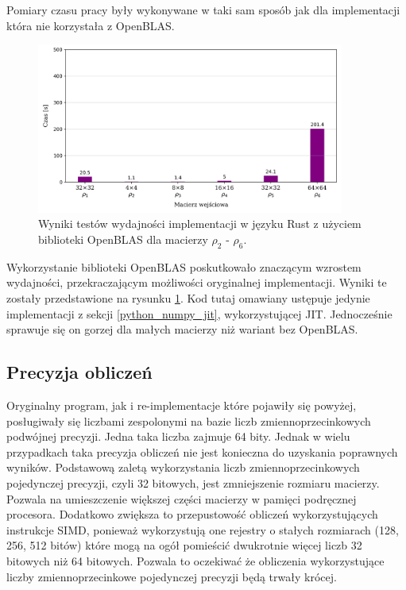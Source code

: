 \documentclass[11pt, a4paper]{article}
\begin{document}
\begin{sloppypar}
    Pomiary czasu pracy były wykonywane w taki sam sposób jak dla implementacji która nie
    korzystała z OpenBLAS.

    \FloatBarrier
    \begin{figure}[ht]
      \centering
      \includegraphics[width=0.9\textwidth]{"resources/rust_blas_perf_tests.png"}
      \caption{Wyniki testów wydajności implementacji w języku Rust z użyciem biblioteki OpenBLAS dla macierzy $\rho
      _{2}$ - $\rho_{6}$.}
      \label{fifth-perf}
    \end{figure}
    \FloatBarrier

    Wykorzystanie biblioteki OpenBLAS poskutkowało znaczącym wzrostem wydajności, przekraczającym
    możliwości oryginalnej implementacji. Wyniki te zostały przedstawione na rysunku
    \ref{fifth-perf}. Kod tutaj omawiany ustępuje jedynie implementacji z sekcji \ref{python_numpy_jit},
    wykorzystującej JIT. Jednocześnie sprawuje się on gorzej dla małych macierzy niż wariant
    bez OpenBLAS.

    \subsection{Precyzja obliczeń}
    Oryginalny program, jak i re-implementacje które pojawiły się powyżej, posługiwały się
    liczbami zespolonymi na bazie liczb zmiennoprzecinkowych podwójnej precyzji. Jedna
    taka liczba zajmuje 64 bity. Jednak w wielu przypadkach taka precyzja obliczeń nie jest
    konieczna do uzyskania poprawnych wyników. Podstawową zaletą wykorzystania liczb
    zmiennoprzecinkowych pojedynczej precyzji, czyli 32 bitowych, jest zmniejszenie
    rozmiaru macierzy. Pozwala na umieszczenie większej części macierzy w pamięci podręcznej
    procesora. Dodatkowo zwiększa to przepustowość obliczeń wykorzystujących instrukcje
    SIMD, ponieważ wykorzystują one rejestry o stałych rozmiarach (128, 256, 512 bitów) które
    mogą na ogół pomieścić dwukrotnie więcej liczb 32 bitowych niż 64 bitowych. Pozwala
    to oczekiwać że obliczenia wykorzystujące liczby zmiennoprzecinkowe pojedynczej
    precyzji będą trwały krócej.


\end{sloppypar}
\end{document}
